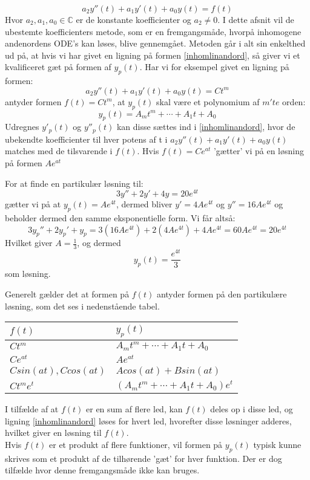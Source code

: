 \begin{equation}
\label{inhomlinandord}
    a_2y''(t)+a_1y'(t)+a_0y(t)=f(t)
\end{equation} \hfill \break
Hvor $a_2,a_1,a_0\in \mathbb{C}$ er de konstante koefficienter og $a_2 \neq 0$. I dette afsnit vil de ubestemte koefficienters metode, som er en fremgangsmåde, hvorpå inhomogene andenordens ODE's kan løses, blive gennemgået.
Metoden går i alt sin enkelthed ud på, at hvis vi har givet en ligning på formen \eqref{inhomlinandord}, så giver vi et kvalificeret gæt på formen af $y_p(t)$. Har vi for eksempel givet en ligning på formen:
\begin{equation*}
    a_2y''(t)+a_1y'(t)+a_0y(t)=Ct^m
\end{equation*} \hfill \break
antyder formen $f(t)=Ct^m$, at $y_p(t)$ skal være et polynomium af $m'te$ orden:
\begin{equation*}
    y_p(t)=A_mt^m+\cdots +A_1t+A_0
\end{equation*} \hfill \break
Udregnes $y'_p(t)$ og $y''_p(t)$ kan disse sættes ind i \ref{inhomlinandord}, hvor de ubekendte koefficienter til hver potens af t i $a_2y''(t)+a_1y'(t)+a_0y(t)$ matches med de tilsvarende i $f(t)$. 
Hvis $f(t)=Ce^{at}$ 'gætter' vi på en løsning på formen $Ae^{at}$
\begin{Example}\hfill \break
\textnormal{For at finde en partikulær løsning til:}\hfill \break
$$3y''+2y'+4y=20e^{4t}$$ \hfill \break
\textnormal{gætter vi på at $y_p(t)=Ae^{4t}$, dermed bliver $y'=4Ae^{4t}$ og $y''=16Ae^{4t}$ og beholder dermed den samme eksponentielle form. Vi får altså:} \hfill \break
$$3y_p''+2y_p'+y_p=3(16Ae^{4t})+2(4Ae^{4t})+4Ae^{4t}=60Ae^ {4t}=20e^{4t}$$ \hfill \break
\textnormal{Hvilket giver $A=\frac{1}{3}$, og dermed} \hfill \break
$$y_p(t)=\frac{e^{4t}}{3}$$ \textnormal{som løsning.}

\end{Example}
Generelt gælder det at formen på $f(t)$ antyder formen på den partikulære løsning, som det ses i nedenstående tabel. 
\begin{table}[H]
    \centering
    \begin{tabular}{|l|l|}
    \hline
       $f(t)$  & $y_p(t)$ \\ \hline
        $Ct^m$ & $A_mt^m+\cdots +A_1t+A_0$ \\ \hline
        $Ce^{at}$ & $Ae^{at}$ \\ \hline
        $C sin(at) , C cos(at)$ & $ A cos(at) + B sin(at)$ \\ \hline
        $Ct^me^t$ & $(A_mt^m+ \cdots +A_1t+A_0)e^t$ \\ \hline
        \end{tabular}
\end{table}
I tilfælde af at $f(t)$ er en sum af flere led, kan $f(t)$ deles op i disse led, og ligning \ref{inhomlinandord} løses for hvert led, hvorefter disse løsninger adderes, hvilket giver en løsning til $f(t)$. \\
Hvis $f(t)$ er et produkt af flere funktioner, vil formen på $y_p(t)$ typisk kunne skrives som et produkt af de tilhørende 'gæt' for hver funktion.
Der er dog tilfælde hvor denne fremgangsmåde ikke kan bruges.

